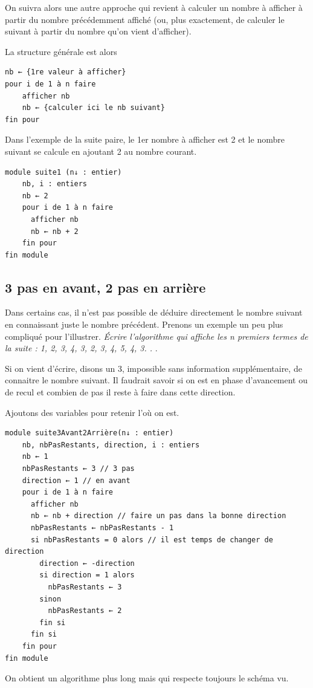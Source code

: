 \documentclass[11pt,a4paper]{article}
\begin{document}
        On suivra alors une autre approche
        qui revient \`a calculer un nombre \`a afficher \`a partir du nombre pr\'ec\'edemment affich\'e (ou, plus
        exactement, de calculer le suivant \`a partir du nombre qu'on vient d'afficher). \par
				
        La structure g\'en\'erale est alors
      
            \par
        \begin{verbatim}
nb ← {1re valeur à afficher}
pour i de 1 à n faire
    afficher nb
    nb ← {calculer ici le nb suivant}
fin pour
      \end{verbatim}
        Dans l'exemple de la suite paire, le 1er nombre \`a afficher est 
        2 et le nombre suivant se calcule en ajoutant 2 au nombre courant.
      
            \par
        \begin{verbatim}
module suite1 (n↓ : entier)
    nb, i : entiers
    nb ← 2
    pour i de 1 à n faire
      afficher nb
      nb ← nb + 2
    fin pour
fin module
      \end{verbatim}\subsection{3 pas en avant, 2 pas en arri\`ere}
		    Dans certains cas, il n'est pas possible de d\'eduire directement le nombre suivant en connaissant juste le nombre pr\'ec\'edent. 
		    Prenons un exemple un peu plus compliqu\'e pour l'illustrer.
		    \guillemotleft  \textit{\'Ecrire l'algorithme qui affiche les n premiers termes de la suite : 1, 2, 3, 4, 3, 2, 3, 4, 5, 4, 3. . }. \guillemotright 
      
            \par
        
        Si on vient d'\'ecrire, disons un 3, impossible sans information suppl\'ementaire, de connaitre
        le nombre suivant. Il faudrait savoir si on est en phase d'avancement ou de recul et combien
        de pas il reste \`a faire dans cette direction.
      
            \par
        
        Ajoutons des variables pour retenir l' o\`u on est.
      
            \par
        \begin{verbatim}
module suite3Avant2Arrière(n↓ : entier)
    nb, nbPasRestants, direction, i : entiers
    nb ← 1
    nbPasRestants ← 3 // 3 pas
    direction ← 1 // en avant
    pour i de 1 à n faire
      afficher nb
      nb ← nb + direction // faire un pas dans la bonne direction
      nbPasRestants ← nbPasRestants - 1
      si nbPasRestants = 0 alors // il est temps de changer de direction
        direction ← -direction
        si direction = 1 alors
          nbPasRestants ← 3
        sinon
          nbPasRestants ← 2
        fin si
      fin si
    fin pour
fin module
      \end{verbatim}
        On obtient un algorithme plus long mais qui respecte toujours le sch\'ema vu.
      
\end{document}
